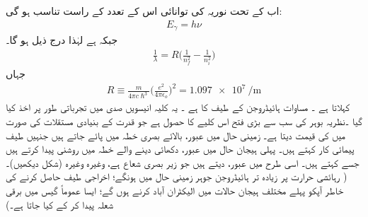اب   کے تحت  نوریہ  کی توانائی اس کے تعدد کے راست تناسب ہو گی:
\begin{align}
E_{\gamma}=h\nu
\end{align}
جبکہ        ہے لہٰذا درج ذیل ہو گا۔
\begin{align}\label{مساوات_تین_ابعادی_رڈبرگ_کلیہ}
\frac{1}{\lambda}=R\big(\frac{1}{n^{2}_{f}}-\frac{1}{n^{2}_{i}}\big)
\end{align}
جہاں 
\begin{align}
R\equiv \frac{m}{4\pi{c}\hslash^{3}}\big(\frac{e^{2}}{4\pi\epsilon_{o}}\big)^{2}=\SI{1.097e7}{\per\meter}
\end{align}
 کہلاتا ہے ۔ مساوات  ہائیڈروجن کے طیف کا    ہے ۔ یہ کلیہ انیسویں  صدی میں تجرباتی طور پر اخذ کیا گیا ۔نظریہ بوہر  کی سب سے بڑی فتح  اس کلیے کا حصول ہے جو قدرت کے بنیادی مستقلات  کی صورت میں   کی قیمت دیتا ہے۔ زمینی حال    میں عبور،   بالائے بصری خطہ میں پائے  جاتے  ہیں  جنہیں    طیف پیمائی کار   کہتے ہیں۔ پہلی  ہیجان  حال  
میں عبور،     دکھائی دینے والے خطہ میں  روشنی پیدا  کرتے  ہیں  جسے   کہتے ہیں۔  اسی طرح   
میں  عبور،   دیتے ہیں  جو  زیر  بصری شعاع ہے، وغیرہ وغیرہ  (شکل        دیکھیں)۔  (  رہائشی حرارت پر زیادہ تر  ہائیڈروجن  جوہر زمینی حال میں ہونگے؛ اخراجی طیف حاصل کرنے کی خاطر آپکو پہلے مختلف  ہیجان  حالات میں الیکٹران  آباد کرنے ہوں گے؛  ایسا عموماً گیس میں برقی شعلہ   پیدا کر کے کیا جاتا ہے۔)


